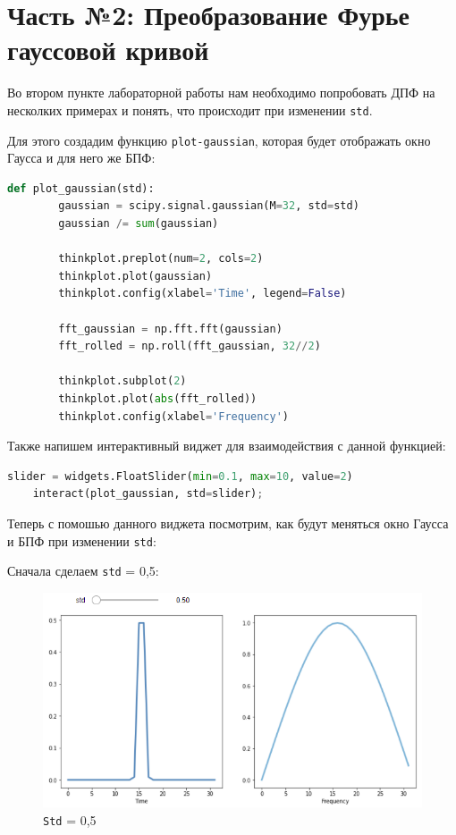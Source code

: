 \documentclass[a4paper]{article}
\begin{document}
    \newpage
        \section{Часть №2: Преобразование Фурье гауссовой кривой}
            Во втором пункте лабораторной работы нам необходимо попробовать ДПФ на несколких примерах и понять, что происходит при изменении \texttt{std}.
            
            Для этого создадим функцию \texttt{plot-gaussian}, которая будет отображать окно Гаусса и для него же БПФ:
            
\begin{lstlisting}[language=Python, caption= Функция \texttt{plot-gaussian}]
    def plot_gaussian(std):
        gaussian = scipy.signal.gaussian(M=32, std=std)
        gaussian /= sum(gaussian)
        
        thinkplot.preplot(num=2, cols=2)
        thinkplot.plot(gaussian)
        thinkplot.config(xlabel='Time', legend=False)
    
        fft_gaussian = np.fft.fft(gaussian)
        fft_rolled = np.roll(fft_gaussian, 32//2)
        
        thinkplot.subplot(2)
        thinkplot.plot(abs(fft_rolled))
        thinkplot.config(xlabel='Frequency')
\end{lstlisting}
            
            Также напишем интерактивный виджет для взаимодействия с данной функцией:
            
\begin{lstlisting}[language=Python, caption= Интерактивный виджет для функции \texttt{plot-gaussian}]
    slider = widgets.FloatSlider(min=0.1, max=10, value=2)
    interact(plot_gaussian, std=slider);
\end{lstlisting}
            
            Теперь с помошью данного виджета посмотрим, как будут меняться окно Гаусса и БПФ при изменении \texttt{std}:
            
            Сначала сделаем \texttt{std} = 0,5:
            
            \begin{figure}[H]
                \centering
                \includegraphics[width=\textwidth]{ex_2_std_0_5.png}
                \caption{\texttt{Std} = 0,5}
                \label{fig:ex_2_std_0_5}
            \end{figure}
            
\end{document}
